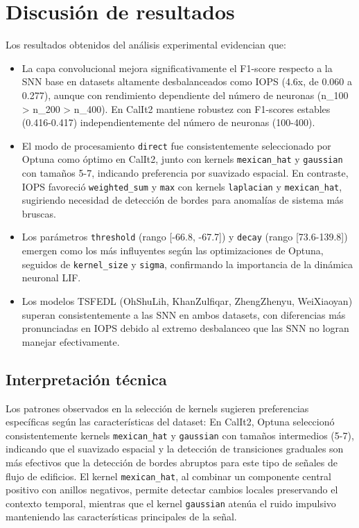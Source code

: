 \section{Discusión de resultados}
Los resultados obtenidos del análisis experimental evidencian que:
\begin{itemize}
    \item La capa convolucional mejora significativamente el F1-score respecto a la SNN base en datasets altamente desbalanceados como IOPS (4.6x, de 0.060 a 0.277), aunque con rendimiento dependiente del número de neuronas (n\_100 > n\_200 > n\_400). En CalIt2 mantiene robustez con F1-scores estables (0.416-0.417) independientemente del número de neuronas (100-400).
    \item El modo de procesamiento \texttt{direct} fue consistentemente seleccionado por Optuna como óptimo en CalIt2, junto con kernels \texttt{mexican\_hat} y \texttt{gaussian} con tamaños 5-7, indicando preferencia por suavizado espacial. En contraste, IOPS favoreció \texttt{weighted\_sum} y \texttt{max} con kernels \texttt{laplacian} y \texttt{mexican\_hat}, sugiriendo necesidad de detección de bordes para anomalías de sistema más bruscas.
    \item Los parámetros \texttt{threshold} (rango [-66.8, -67.7]) y \texttt{decay} (rango [73.6-139.8]) emergen como los más influyentes según las optimizaciones de Optuna, seguidos de \texttt{kernel\_size} y \texttt{sigma}, confirmando la importancia de la dinámica neuronal LIF.
    \item Los modelos TSFEDL (OhShuLih, KhanZulfiqar, ZhengZhenyu, WeiXiaoyan) superan consistentemente a las SNN en ambos datasets, con diferencias más pronunciadas en IOPS debido al extremo desbalanceo que las SNN no logran manejar efectivamente.
\end{itemize}

\subsection{Interpretación técnica}
Los patrones observados en la selección de kernels sugieren preferencias específicas según las características del dataset:
En CalIt2, Optuna seleccionó consistentemente kernels \texttt{mexican\_hat} y \texttt{gaussian} con tamaños intermedios (5-7), indicando que el suavizado espacial y la detección de transiciones graduales son más efectivos que la detección de bordes abruptos para este tipo de señales de flujo de edificios. El kernel \texttt{mexican\_hat}, al combinar un componente central positivo con anillos negativos, permite detectar cambios locales preservando el contexto temporal, mientras que el kernel \texttt{gaussian} atenúa el ruido impulsivo manteniendo las características principales de la señal.


